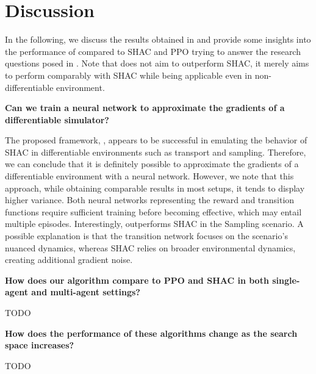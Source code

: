 \section{Discussion}
In the following, we discuss the results obtained in  and provide some insights into the performance of \fname{} compared to SHAC and PPO trying to answer the research questions posed in .
Note that \fname{} does not aim to outperform SHAC, it merely aims to perform comparably with SHAC while being applicable even in non-differentiable environment. 
\begin{center}
 \textbf{Can we train a neural network to approximate the gradients of a differentiable simulator?}
\end{center}

The proposed framework, \fname{}, appears to be successful in emulating the behavior of SHAC in differentiable environments such as transport and sampling. 
Therefore, we can conclude that it is definitely possible to approximate the gradients of a differentiable environment with a neural network. 
However, we note that this approach, while obtaining comparable results in most setups, it tends to display higher variance. 
Both neural networks representing the reward and transition functions require sufficient training before becoming effective, which may entail multiple episodes. Interestingly, \fname{} outperforms SHAC in the Sampling scenario. A possible explanation is that the transition network focuses on the scenario's nuanced dynamics, whereas SHAC relies on broader environmental dynamics, creating additional gradient noise.
\begin{center}
 \textbf{How does our algorithm compare to PPO and SHAC in both single-agent and multi-agent settings?}
\end{center}
TODO

\begin{center}
 \textbf{How does the performance of these algorithms change as the search space increases?}
\end{center}
TODO
